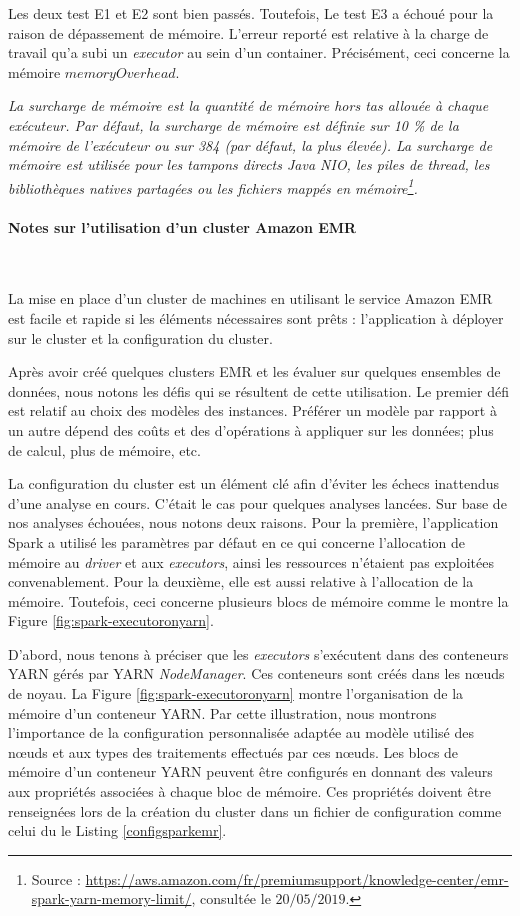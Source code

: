 Les deux test E1 et E2 sont bien passés. Toutefois, Le test E3 a échoué pour la raison de dépassement de mémoire. L'erreur reporté est relative à la charge de travail qu'a subi un \textit{executor} au sein d'un container. Précisément, ceci concerne la mémoire $ memoryOverhead $. 

\textit{La surcharge de mémoire est la quantité de mémoire hors tas allouée à chaque exécuteur. Par défaut, la surcharge de mémoire est définie sur 10 \% de la mémoire de l'exécuteur ou sur 384 (par défaut, la plus élevée). La surcharge de mémoire est utilisée pour les tampons directs Java NIO, les piles de thread, les bibliothèques natives partagées ou les fichiers mappés en mémoire\footnote{Source : \url{https://aws.amazon.com/fr/premiumsupport/knowledge-center/emr-spark-yarn-memory-limit/}, consultée le $20/05/2019$.}.}

\paragraph{Notes sur l'utilisation d'un cluster Amazon EMR}~

La mise en place d'un cluster de machines en utilisant le service Amazon EMR est facile et rapide si les éléments nécessaires sont prêts : l'application à déployer sur le cluster et la configuration du cluster.

Après avoir créé quelques clusters EMR et les évaluer sur quelques ensembles de données, nous notons les défis qui se résultent de cette utilisation. 
Le premier défi est relatif au  choix des modèles des instances. Préférer un modèle par rapport à un autre dépend des coûts et   des d'opérations à appliquer sur les données; plus de calcul, plus de mémoire, etc.

La configuration du cluster est un élément clé afin d'éviter les échecs inattendus d'une analyse en cours. C'était le cas pour  quelques analyses lancées. Sur base de nos  analyses échouées, nous notons deux  raisons. Pour la première,  l'application Spark a  utilisé les paramètres par défaut en ce qui concerne l'allocation de mémoire au  \textit{driver} et aux \textit{executors}, ainsi les ressources n'étaient pas exploitées convenablement.  Pour la deuxième, elle est aussi relative  à l'allocation de la mémoire. Toutefois, ceci concerne plusieurs blocs de mémoire comme le montre la Figure 	\ref{fig:spark-executoronyarn}.


D'abord, nous tenons à préciser que les \textit{executors} s'exécutent dans des conteneurs YARN gérés par YARN \textit{NodeManager}. Ces conteneurs sont créés dans les n\oe{}uds de noyau. La Figure 	\ref{fig:spark-executoronyarn} montre l'organisation de la mémoire d'un conteneur YARN. Par cette illustration, nous montrons l'importance de la configuration personnalisée adaptée au modèle utilisé  des n\oe{}uds et aux types des traitements effectués par ces n\oe{}uds. 
Les blocs de mémoire d'un conteneur YARN   peuvent être configurés en donnant des valeurs aux propriétés associées à chaque bloc de mémoire. Ces propriétés doivent être renseignées lors de la création du cluster  dans un fichier de configuration  comme celui du le Listing \ref{configsparkemr}.

